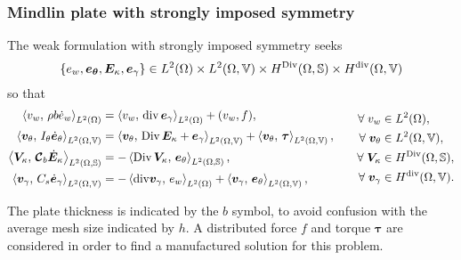 \subsubsection{Mindlin plate with strongly imposed symmetry}\label{sec:min_strong}
The weak formulation with strongly imposed symmetry seeks 
$$\{e_w, \bm{e}_{\bm{\theta}}, \bm{E}_{\kappa}, \bm{e}_{\gamma}\} \in L^2(\Omega) \times L^2(\Omega, \mathbb{V}) \times H^{\operatorname*{Div}}(\Omega, \mathbb{S}) \times H^{\operatorname{div}}(\Omega, \mathbb{V})$$
 so that 
\begin{equation}
\label{eq:weak_min_div_strong}
\begin{aligned}
\inner[L^2(\Omega)]{v_w}{\rho b \dot{e}_w} &= \inner[L^2(\Omega)]{v_w}{\div \bm{e}_\gamma} + (v_w, f), \\ 
\inner[L^2(\Omega, \mathbb{V})]{\bm{v}_\theta}{I_\theta \dot{\bm{e}}_\theta} &= \inner[L^2(\Omega, \mathbb{V})]{\bm{v}_\theta}{\Div \bm{E}_\kappa + \bm{e}_\gamma} + \inner[L^2(\Omega, \mathbb{V})]{\bm{v}_\theta}{\bm{\tau}}, \\  
\inner[L^2(\Omega, \mathbb{S})]{\bm{V}_\kappa}{\bm{\mathcal{C}}_{b} \dot{\bm{E}}_\kappa} &= -\inner[L^2(\Omega, \mathbb{S})]{\Div \bm{V}_\kappa}{\bm{e}_\theta}, \\ 
\inner[L^2(\Omega, \mathbb{V})]{\bm{v}_\gamma}{C_s \dot{\bm{e}}_\gamma} &= -\inner[L^2(\Omega)]{\mathrm{div} \bm{v}_\gamma}{e_w} + \inner[L^2(\Omega, \mathbb{V})]{\bm{v}_\gamma}{\bm{e}_{\theta}}, \\ 
\end{aligned} \qquad
\begin{aligned}
\forall\; v_w &\in L^2(\Omega), \\
\forall\; \bm{v}_\theta &\in L^2(\Omega, \mathbb{V}), \\
\forall\; \bm{V}_\kappa &\in H^{\Div}(\Omega, \mathbb{S}), \\
\forall\; \bm{v}_\gamma &\in H^{\div}(\Omega, \mathbb{V}).
\end{aligned}
\end{equation}

The plate thickness is indicated by the $b$ symbol, to avoid confusion with the average mesh size indicated by $h$. A distributed force $f$ and torque $\bm{\tau}$ are considered in order to find a manufactured solution for this problem. \\

